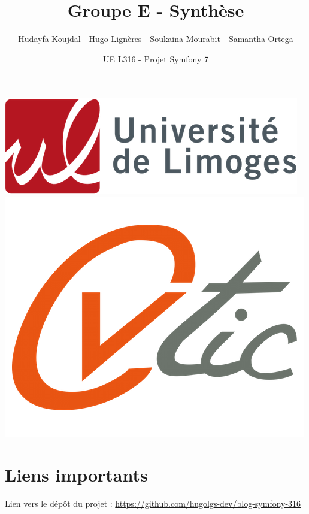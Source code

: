 \documentclass[12pt,a4paper]{article}
\title{Groupe E - Synthèse}
\author{Hudayfa Koujdal - Hugo Lignères - Soukaina Mourabit - Samantha Ortega}
\date{UE L316 - Projet Symfony 7}
\begin{document}
\maketitle

\hrulefill
\vspace{6cm}
\begin{center}
	\includegraphics[scale=.4]{../images/univ.png}
		\\
		\vspace{2cm}
	\includegraphics[scale=.25]{../images/cvtic.png}
\end{center}

\newpage

\tableofcontents

\newpage

\section{Liens importants}


Lien vers le dépôt du projet : \url{https://github.com/hugolgs-dev/blog-symfony-316}
\end{document}
